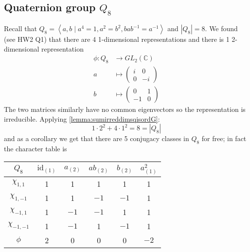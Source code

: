 \documentclass[a4paper]{article}
\newcommand{\la}{\left\langle}
\newcommand{\ra}{\right\rangle}
\newcommand{\C}{\mathbb{C}}
\newcommand{\id}{\text{id}}
\theoremstyle{definition}
\begin{document}
\subsection{Quaternion group $Q_8$}
Recall that $Q_8=\la a,b\mid a^4=1,a^2=b^2,bab^{-1}=a^{-1}\ra$ and $|Q_8|=8$. We found (see HW2 Q1) that there are 4 1-dimensional representations and there is 1 2-dimensional representation
\[
\begin{aligned}
\phi:Q_8&\rightarrow GL_2(\C)\\
a&\mapsto\begin{pmatrix}
i&0\\0&-i
\end{pmatrix}\\
b&\mapsto\begin{pmatrix}
0&1\\-1&0
\end{pmatrix}
\end{aligned}
\]
The two matrices similarly have no common eigenvectors so the representation is irreducible. Applying \ref{lemma:sumirreddimsqisordG}:
\[
1\cdot 2^2+4\cdot 1^2=8=|Q_8|
\]
and as a corollary we get that there are 5 conjugacy classes in $Q_8$ for free; in fact the character table is
\begin{table}[H]
\centering
\begin{tabular}{c|ccccc}
$Q_8$          & $\id_{(1)}$ & $a_{(2)}$ & $ab_{(2)}$ & $b_{(2)}$ & $a^2_{(1)}$ \\ \hline
$\chi_{1,1}$   & 1           & 1         & 1          & 1         & 1           \\
$\chi_{1,-1}$  & 1           & 1         & $-1$       & $-1$      & 1           \\
$\chi_{-1,1}$  & 1           & $-1$      & $-1$       & 1         & 1           \\
$\chi_{-1,-1}$ & 1           & $-1$      & 1          & $-1$      & 1           \\
$\phi$         & 2           & 0         & 0          & 0         & $-2$       
\end{tabular}
\end{table}
\end{document}
